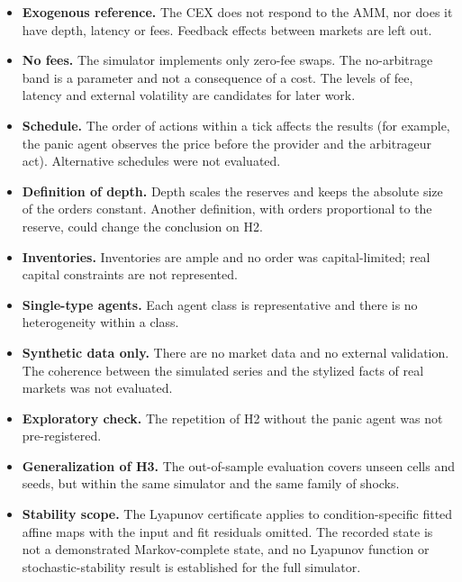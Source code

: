 \begin{itemize}
  \item \textbf{Exogenous reference.} The CEX does not respond to the AMM, nor does it have depth, latency or fees. Feedback effects between markets are left out.
  \item \textbf{No fees.} The simulator implements only zero-fee swaps. The no-arbitrage band is a parameter and not a consequence of a cost. The levels of fee, latency and external volatility are candidates for later work.
  \item \textbf{Schedule.} The order of actions within a tick affects the results (for example, the panic agent observes the price before the provider and the arbitrageur act). Alternative schedules were not evaluated.
  \item \textbf{Definition of depth.} Depth scales the reserves and keeps the absolute size of the orders constant. Another definition, with orders proportional to the reserve, could change the conclusion on H2.
  \item \textbf{Inventories.} Inventories are ample and no order was capital-limited; real capital constraints are not represented.
  \item \textbf{Single-type agents.} Each agent class is representative and there is no heterogeneity within a class.
  \item \textbf{Synthetic data only.} There are no market data and no external validation. The coherence between the simulated series and the stylized facts of real markets was not evaluated.
  \item \textbf{Exploratory check.} The repetition of H2 without the panic agent was not pre-registered.
  \item \textbf{Generalization of H3.} The out-of-sample evaluation covers unseen cells and seeds, but within the same simulator and the same family of shocks.
  \item \textbf{Stability scope.} The Lyapunov certificate applies to condition-specific fitted affine maps with the input and fit residuals omitted. The recorded state is not a demonstrated Markov-complete state, and no Lyapunov function or stochastic-stability result is established for the full simulator.
\end{itemize}
